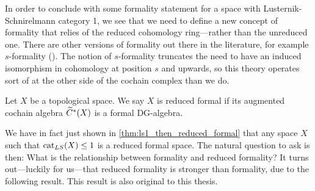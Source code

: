 In order to conclude with some formality statement for a space with Lusternik-Schnirelmann category 1, we see that we need to define a new concept of formality that relies of the reduced cohomology ring---rather than the unreduced one. There are other versions of formality out there in the literature, for example $s$-formality (\cite{sformality}). The notion of $s$-formality truncates the need to have an induced isomorphism in cohomology at position $s$ and upwards, so this theory operates sort of at the other side of the cochain complex than we do. 

\begin{definition}
Let $X$ be a topological space. We say $X$ is reduced formal if its augmented cochain algebra $\widetilde{C}^*(X)$ is a formal DG-algebra. 
\end{definition}

We have in fact just shown in \ref{thm:ls1_then_reduced_formal} that any space $X$ such that $\text{cat}_{LS}(X)\leq 1$ is a reduced formal space. The natural question to ask is then: What is the relationship between formality and reduced formality? It turns out---luckily for us---that reduced formality is stronger than formality, due to the following result. This result is also original to this thesis. 

